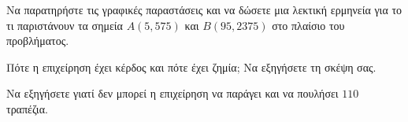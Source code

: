 \begin{alist}
\begin{center}

\end{center}

\begin{rlist}
\item Να παρατηρήστε τις γραφικές παραστάσεις και να δώσετε μια λεκτική ερμηνεία για το τι παριστάνουν τα σημεία $A(5,575)$ και $B(95, 2375)$ στο πλαίσιο του προβλήματος.
\item Πότε η επιχείρηση έχει κέρδος και πότε έχει ζημία; Να εξηγήσετε τη σκέψη σας.
\item Να εξηγήσετε γιατί δεν μπορεί η επιχείρηση να παράγει και να πουλήσει $110$ τραπέζια.

\end{rlist}
\end{alist}


